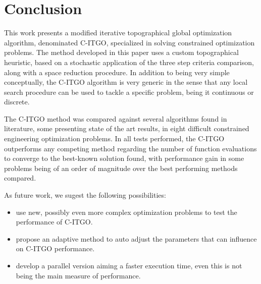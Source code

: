 \section{Conclusion} \label{sec:Conclusion}

This work presents a modified iterative topographical global optimization algorithm, denominated C-ITGO, specialized in solving constrained optimization problems. The method developed in this paper uses a custom topographical heuristic, based on a stochastic application of the three step criteria comparison, along with a space reduction procedure. In addition to being very simple conceptually, the C-ITGO algorithm is very generic in the sense that any local search procedure can be used to tackle a specific problem, being it continuous or discrete.

The C-ITGO method was compared against several algorithms found in literature, some presenting state of the art results, in eight difficult constrained engineering optimization problems. In all tests performed, the C-ITGO outperforms any competing method regarding the number of function evaluations to converge to the best-known solution found, with performance gain in some problems being of an order of magnitude over the best performing methods compared.

As future work, we sugest the following possibilities:

\begin{itemize}

    \item use new, possibly even more complex optimization problems to test the performance of C-ITGO.

    \item propose an adaptive method to auto adjust the parameters that can influence on C-ITGO performance.

    \item develop a parallel version aiming a faster execution time, even this is not being the main measure of performance.


\end{itemize}